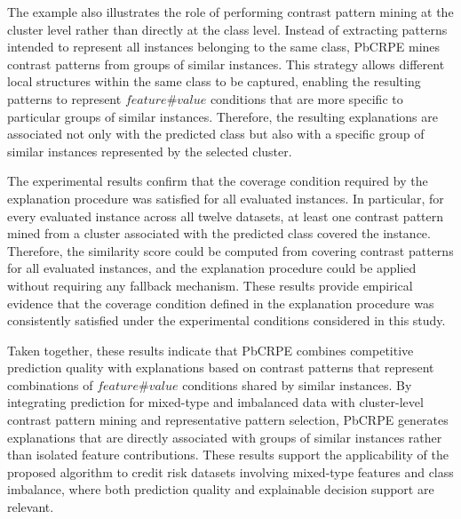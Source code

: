 {The example also illustrates the role of performing contrast pattern mining at the cluster level rather than directly at the class level. Instead of extracting patterns intended to represent all instances belonging to the same class, PbCRPE mines contrast patterns from groups of similar instances. This strategy allows different local structures within the same class to be captured, enabling the resulting patterns to represent $feature\#value$ conditions that are more specific to particular groups of similar instances. Therefore, the resulting explanations are associated not only with the predicted class but also with a specific group of similar instances represented by the selected cluster.\newline

The experimental results confirm that the coverage condition required by the explanation procedure was satisfied for all evaluated instances. In particular, for every evaluated instance across all twelve datasets, at least one contrast pattern mined from a cluster associated with the predicted class covered the instance. Therefore, the similarity score could be computed from covering contrast patterns for all evaluated instances, and the explanation procedure could be applied without requiring any fallback mechanism. These results provide empirical evidence that the coverage condition defined in the explanation procedure was consistently satisfied under the experimental conditions considered in this study.\newline

Taken together, these results indicate that PbCRPE combines competitive prediction quality with explanations based on contrast patterns that represent combinations of $feature\#value$ conditions shared by similar instances. By integrating prediction for mixed-type and imbalanced data with cluster-level contrast pattern mining and representative pattern selection, PbCRPE generates explanations that are directly associated with groups of similar instances rather than isolated feature contributions. These results support the applicability of the proposed algorithm to credit risk datasets involving mixed-type features and class imbalance, where both prediction quality and explainable decision support are relevant.
}